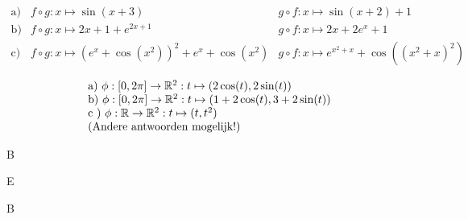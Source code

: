 \begin{Oplossing}{1}
\[
\begin{array}{lll}
\mbox{a)} & f\circ g:x\mapsto \sin(x+3) & g\circ f:x\mapsto \sin(x+2)+1\\
\mbox{b)} & f\circ g:x\mapsto 2x+1+e^{2x+1} & g\circ f:x\mapsto 2x+2e^x+1\\
\mbox{c)} & f\circ g:x\mapsto (e^x+\cos(x^2))^2+e^x+\cos(x^2) & g\circ f:x\mapsto
e^{x^2+x}+\cos((x^2+x)^2)
\end{array}
\]
\end{Oplossing}
\begin{Oplossing}{5}
\[
\ba{l}
\mbox{a)~} \phi: [0,2\pi] \rightarrow \R^2: t\mapsto
(2\cos(t),2\sin(t))\\
\mbox{b)~} \phi: [0,2\pi] \rightarrow \R^2: t\mapsto
(1+2\cos(t),3+2\sin(t))\\
\mbox{c~)~} \phi: \R \rightarrow \R^2: t\mapsto
(t,t^2)\\
\mbox{(Andere antwoorden mogelijk!)}
\ea
\]
\end{Oplossing}
\begin{Oplossing}{7}
B
\end{Oplossing}
\begin{Oplossing}{8}
E
\end{Oplossing}
\begin{Oplossing}{9}
B
\end{Oplossing}

